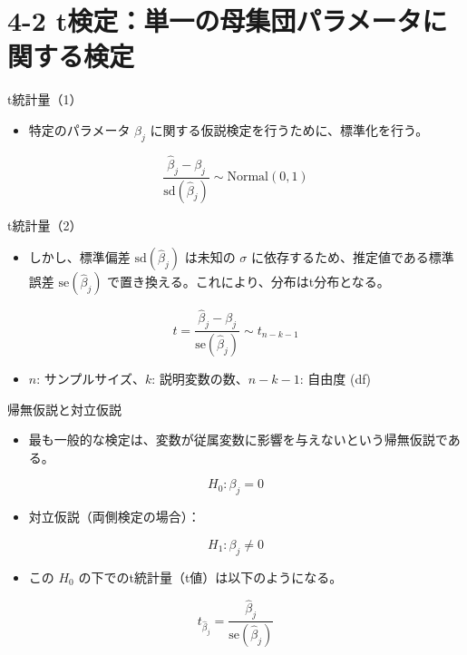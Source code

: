 \documentclass[
  ignorenonframetext,
]{beamer}
\providecommand{\tightlist}{%
  \setlength{\itemsep}{0pt}\setlength{\parskip}{0pt}}
\begin{document}
\section{4-2
t検定：単一の母集団パラメータに関する検定}\label{tux691cux5b9aux5358ux4e00ux306eux6bcdux96c6ux56e3ux30d1ux30e9ux30e1ux30fcux30bfux306bux95a2ux3059ux308bux691cux5b9a}

\begin{frame}{t統計量（1）}
\label{tux7d71ux8a08ux91cf1}
\begin{itemize}
\tightlist
\item
  特定のパラメータ \(\beta_j\)
  に関する仮説検定を行うために、標準化を行う。
\end{itemize}

\[ \frac{\hat{\beta}_j - \beta_j}{\text{sd}(\hat{\beta}_j)} \sim \text{Normal}(0, 1) \]
\end{frame}

\begin{frame}{t統計量（2）}
\label{tux7d71ux8a08ux91cf2}
\begin{itemize}
\tightlist
\item
  しかし、標準偏差 \(\text{sd}(\hat{\beta}_j)\) は未知の \(\sigma\)
  に依存するため、推定値である標準誤差 \(\text{se}(\hat{\beta}_j)\)
  で置き換える。これにより、分布はt分布となる。
\end{itemize}

\[ t = \frac{\hat{\beta}_j - \beta_j}{\text{se}(\hat{\beta}_j)} \sim t_{n-k-1} \]

\begin{itemize}
\tightlist
\item
  \(n\): サンプルサイズ、\(k\): 説明変数の数、\(n-k-1\): 自由度 (df)
\end{itemize}
\end{frame}

\begin{frame}{帰無仮説と対立仮説}
\label{ux5e30ux7121ux4eeeux8aacux3068ux5bfeux7acbux4eeeux8aac}
\begin{itemize}
\tightlist
\item
  最も一般的な検定は、変数が従属変数に影響を与えないという帰無仮説である。
\end{itemize}

\[ H_0: \beta_j = 0 \]

\begin{itemize}
\tightlist
\item
  対立仮説（両側検定の場合）：
\end{itemize}

\[ H_1: \beta_j \neq 0 \]

\begin{itemize}
\tightlist
\item
  この \(H_0\) の下でのt統計量（t値）は以下のようになる。
\end{itemize}

\[ t_{\hat{\beta}_j} = \frac{\hat{\beta}_j}{\text{se}(\hat{\beta}_j)} \]
\end{frame}
\end{document}
